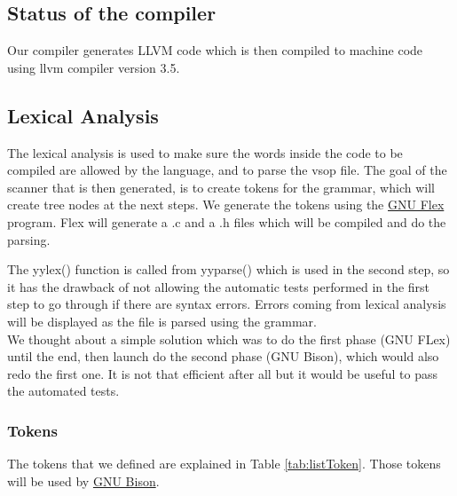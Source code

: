 \documentclass[a4paper,11pt]{article}
\begin{document}
\subsection*{Status of the compiler}

Our compiler generates LLVM code which is then compiled to machine code using llvm compiler version 3.5.

\subsection{Lexical Analysis}
  \label{sec:lexana}
  The lexical analysis is used to make sure the words inside the code to be compiled are allowed by the language, and to parse the vsop file.
  The goal of the scanner that is then generated, is to create tokens for the grammar, which will create tree nodes at the next steps. 
  We generate the tokens using the \href{https://github.com/westes/flex}{GNU Flex} program. Flex will generate a .c and a .h files which will be compiled and do the parsing.

  The yylex() function is called from yyparse() which is used in the second step, so it has the drawback of not allowing the automatic tests performed in the first step to go through if there are syntax errors. Errors coming from lexical analysis will be displayed as the file is parsed using the grammar.\\
  We thought about a simple solution which was to do the first phase (GNU FLex) until the end, then launch do the second phase (GNU Bison), which would also redo the first one. It is not that efficient after all but it would be useful to pass the automated tests.

  \subsubsection{Tokens}
    The tokens that we defined are explained in Table \ref{tab:listToken}. Those tokens will be used by \href{http://www.gnu.org/software/bison/}{GNU Bison}.
\end{document}
